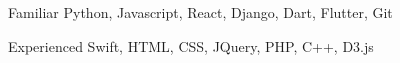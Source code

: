 



\begin{cvskills}


  \cvskill
    {Familiar} %
    {Python, Javascript, React, Django, Dart, Flutter, Git} %


  \cvskill
    {Experienced} %
    {Swift, HTML, CSS, JQuery, PHP, C++, D3.js} %


\end{cvskills}
